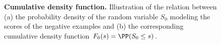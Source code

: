 %
      \begin{figure}[]
         \vspace*{-3mm}
         \caption{
         \textbf{Cumulative density function.}
          Illustration of the relation between (a) the probability density of the random variable $S_0$ modeling the scores of the negative examples and (b) the corresponding cumulative density function $F_0(s)=\PP(S_0 \leq s)$.
         }
          \vspace*{-3mm}
         \label{fig:qntExample}
      \end{figure}
           
